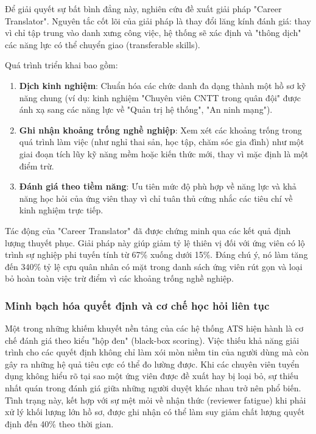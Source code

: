 \documentclass{article}
\begin{document}
Để giải quyết sự bất bình đẳng này, nghiên cứu đề xuất giải pháp "Career Translator". Nguyên tắc cốt lõi của giải pháp là thay đổi lăng kính đánh giá: thay vì chỉ tập trung vào danh xưng công việc, hệ thống sẽ xác định và "thông dịch" các năng lực có thể chuyển giao (transferable skills).

Quá trình triển khai bao gồm:
\begin{enumerate}[topsep=0pt, itemsep=0pt, leftmargin=40pt, label=\arabic*.]
    \item \textbf{Dịch kinh nghiệm}: Chuẩn hóa các chức danh đa dạng thành một hồ sơ kỹ năng chung (ví dụ: kinh nghiệm "Chuyên viên CNTT trong quân đội" được ánh xạ sang các năng lực về "Quản trị hệ thống", "An ninh mạng").
    \item \textbf{Ghi nhận khoảng trống nghề nghiệp}: Xem xét các khoảng trống trong quá trình làm việc (như nghỉ thai sản, học tập, chăm sóc gia đình) như một giai đoạn tích lũy kỹ năng mềm hoặc kiến thức mới, thay vì mặc định là một điểm trừ.
    \item \textbf{Đánh giá theo tiềm năng}: Ưu tiên mức độ phù hợp về năng lực và khả năng học hỏi của ứng viên thay vì chỉ tuân thủ cứng nhắc các tiêu chí về kinh nghiệm trực tiếp.
\end{enumerate}

Tác động của "Career Translator" đã được chứng minh qua các kết quả định lượng thuyết phục. Giải pháp này giúp giảm tỷ lệ thiên vị đối với ứng viên có lộ trình sự nghiệp phi tuyến tính từ 67\% xuống dưới 15\%. Đáng chú ý, nó làm tăng đến 340\% tỷ lệ cựu quân nhân có mặt trong danh sách ứng viên rút gọn và loại bỏ hoàn toàn việc trừ điểm vì các khoảng trống nghề nghiệp.

\subsubsection{Minh bạch hóa quyết định và cơ chế học hỏi liên tục}

Một trong những khiếm khuyết nền tảng của các hệ thống ATS hiện hành là cơ chế đánh giá theo kiểu "hộp đen" (black-box scoring). Việc thiếu khả năng giải trình cho các quyết định không chỉ làm xói mòn niềm tin của người dùng mà còn gây ra những hệ quả tiêu cực có thể đo lường được. Khi các chuyên viên tuyển dụng không hiểu rõ tại sao một ứng viên được đề xuất hay bị loại bỏ, sự thiếu nhất quán trong đánh giá giữa những người duyệt khác nhau trở nên phổ biến. Tình trạng này, kết hợp với sự mệt mỏi về nhận thức (reviewer fatigue) khi phải xử lý khối lượng lớn hồ sơ, được ghi nhận có thể làm suy giảm chất lượng quyết định đến 40\% theo thời gian.
\end{document}
